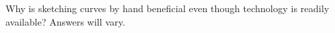 {Why is sketching curves by hand beneficial even though technology is readily available?
}
{Answers will vary.
}
